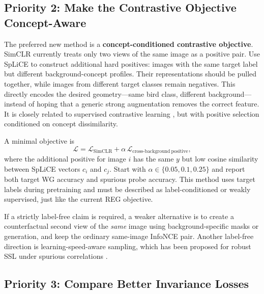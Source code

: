 \documentclass[11pt,a4paper]{article}
\begin{document}
\subsection{Priority 2: Make the Contrastive Objective Concept-Aware}

The preferred new method is a \textbf{concept-conditioned contrastive
objective}. SimCLR currently treats only two views of the same image as a
positive pair. Use SpLiCE to construct additional hard positives: images with
the same target label but different background-concept profiles. Their
representations should be pulled together, while images from different target
classes remain negatives. This directly encodes the desired geometry---same
bird class, different background---instead of hoping that a generic strong
augmentation removes the correct feature. It is closely related to supervised
contrastive learning \cite{khosla2020supcon}, but with positive selection
conditioned on concept dissimilarity.

A minimal objective is
\[
\mathcal L = \mathcal L_{\mathrm{SimCLR}}
+ \alpha\,\mathcal L_{\mathrm{cross\mbox{-}background\ positive}},
\]
where the additional positive for image $i$ has the same $y$ but low cosine
similarity between SpLiCE vectors $c_i$ and $c_j$. Start with
$\alpha\in\{0.05,0.1,0.25\}$ and report both target WG accuracy and spurious
probe accuracy. This method uses target labels during pretraining and must be
described as label-conditioned or weakly supervised, just like the current REG
objective.

If a strictly label-free claim is required, a weaker alternative is to create a
counterfactual second view of the \emph{same} image using background-specific
masks or generation, and keep the ordinary same-image InfoNCE pair. Another
label-free direction is learning-speed-aware sampling, which has been proposed
for robust SSL under spurious correlations \cite{zhu2023lassl}.

\subsection{Priority 3: Compare Better Invariance Losses}
\end{document}
